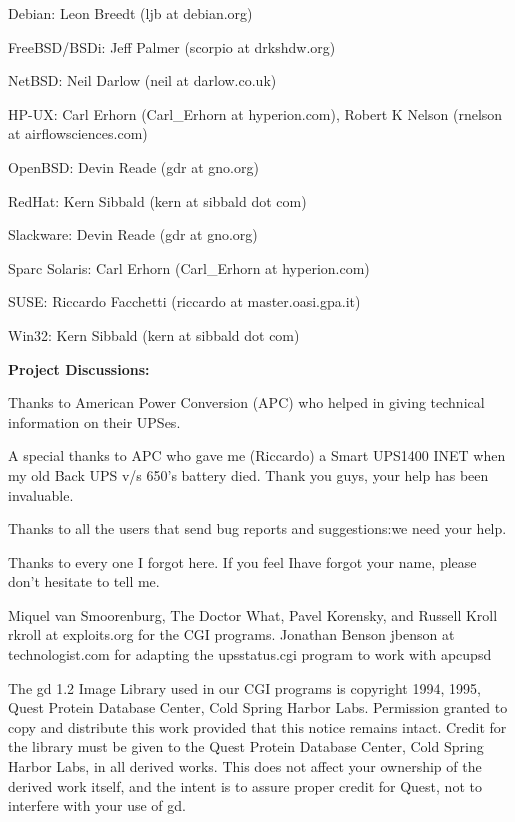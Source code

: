 {{{{{{{{{{{{{{{{{\begin{description}
Debian: Leon Breedt (ljb at debian.org)  

FreeBSD/BSDi: Jeff Palmer (scorpio at drkshdw.org)  

NetBSD: Neil Darlow (neil at darlow.co.uk)  

HP-UX: Carl Erhorn (Carl\_Erhorn at hyperion.com), Robert K Nelson (rnelson at
airflowsciences.com)  

OpenBSD: Devin Reade (gdr at gno.org)  

RedHat: Kern Sibbald (kern at sibbald dot com)  

Slackware: Devin Reade (gdr at gno.org)  

Sparc Solaris: Carl Erhorn (Carl\_Erhorn at hyperion.com)  

SUSE: Riccardo Facchetti (riccardo at master.oasi.gpa.it)  

Win32: Kern Sibbald (kern at sibbald dot com)  

\item {\bf Project Discussions:}
\end{description}

Thanks to American Power Conversion (APC) who helped in giving technical
information on their UPSes.  

A special thanks to APC who gave me (Riccardo) a Smart UPS1400 INET when my
old Back UPS v/s 650's battery died.  Thank you guys, your help has been
invaluable.  

Thanks to all the users that send bug reports and suggestions:we need your
help.  

Thanks to every one I forgot here. If you feel Ihave forgot your name, please
don't hesitate to tell me.  

Miquel van Smoorenburg, The Doctor What, Pavel Korensky, and Russell Kroll
\lt{}rkroll at exploits.org\gt{} for the CGI programs. Jonathan Benson
\lt{}jbenson at technologist.com\gt{} for adapting the upsstatus.cgi program
to work with apcupsd  

The gd 1.2 Image Library used in our CGI programs is copyright 1994, 1995,
Quest Protein Database Center, Cold Spring Harbor Labs. Permission granted to
copy and distribute this work provided that this notice remains intact. Credit
for the library must be given to the Quest Protein Database Center, Cold
Spring Harbor Labs, in all derived works. This does not affect your ownership
of the derived work itself, and the intent is to assure proper credit for
Quest, not to interfere with your use of gd.  

}}}}}}}}}}}}}}}}}
